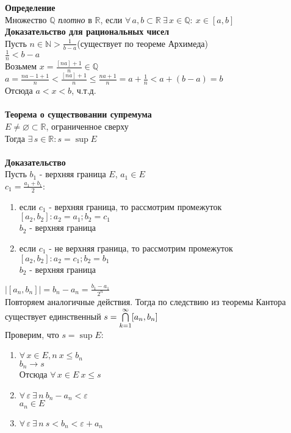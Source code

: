 \documentclass[12pt]{article}
\begin{document}
\textbf{Определение}\\
Множество $\mathbb{Q}$ \textit{плотно} в $\mathbb{R}$, если $\forall\,a,b \subset \mathbb{R}\ \exists\,x\in \mathbb{Q}:\ x\in[a,b]$\\
\textbf{Доказательство для рациональных чисел}\\
Пусть $n \in \mathbb{N} > \frac 1{b-a}$(существует по теореме Архимеда)\\
$\frac 1n < b-a$\\
Возьмем $x=\frac {[na]+1}n \in \mathbb{Q}$\\
$a=\frac{na-1+1}n < \frac{[na]+1}n \leq \frac{na+1}n = a+\frac 1n < a + (b-a) = b$\\
Отсюда $a<x< b$, ч.т.д.\\\\
\textbf{Теорема о существовании супремума}\\
$E\neq \varnothing \subset \mathbb{R}$, ограниченное сверху\\
Тогда $\exists\,s \in \mathbb{R}: s = \sup E$\\\\
\textbf{Доказательство}\\
Пусть $b_1$ - верхняя граница $E$, $a_1 \in E$\\
$c_1=\frac{a_1+b_1}2$:
\begin{enumerate}
    \item если $c_1$ - верхняя граница, то рассмотрим промежуток $[a_2, b_2]: a_2 = a_1; b_2 = c_1$\\
    $b_2$ - верхняя граница
    \item если $c_1$ - не верхняя граница, то рассмотрим промежуток $[a_2, b_2]: a_2 = c_1; b_2 = b_1$\\
    $b_2$ - верхняя граница
\end{enumerate}
$|[a_n,b_n]| = b_n-a_n=\frac{b_1-a_1}{2^n}$\\
Повторяем аналогичные действия. Тогда по следствию из теоремы Кантора существует единственный $s = \bigcap\limits_{k=1}^{\infty} [a_n,b_n]$\\
Проверим, что $s = \sup E$:
\begin{enumerate}
    \item $\forall\,x\in E, n\ x\leq b_n$\\
    $b_n\rightarrow s$\\
    Отсюда $\forall\,x\in E\ x\leq s$
    \item $\forall\,\varepsilon\ \exists\,n\ b_n-a_n<\varepsilon$\\
    $a_n \in E$
    \item $\forall\,\varepsilon\ \exists\,n\ s < b_n<\varepsilon+a_n$
\end{enumerate}
\end{document}
